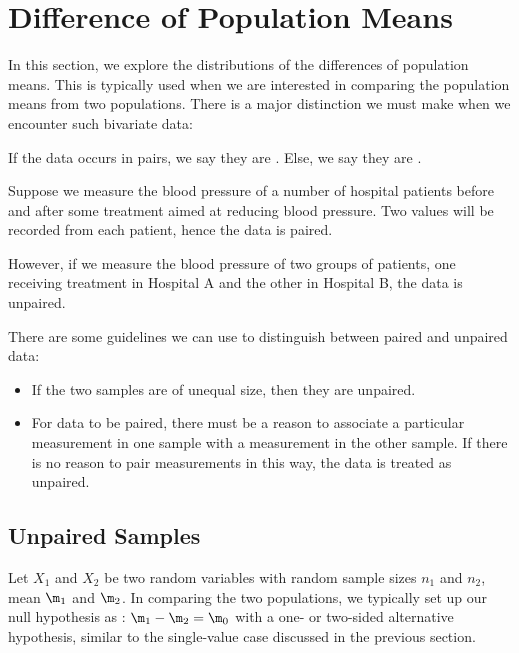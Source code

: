 \section{Difference of Population Means}

In this section, we explore the distributions of the differences of population means. This is typically used when we are interested in comparing the population means from two populations. There is a major distinction we must make when we encounter such bivariate data:

\begin{definition}
    If the data occurs in pairs, we say they are . Else, we say they are .
\end{definition}

\begin{example}
    Suppose we measure the blood pressure of a number of hospital patients before and after some treatment aimed at reducing blood pressure. Two values will be recorded from each patient, hence the data is paired.

    However, if we measure the blood pressure of two groups of patients, one receiving treatment in Hospital A and the other in Hospital B, the data is unpaired.
\end{example}

There are some guidelines we can use to distinguish between paired and unpaired data:
\begin{itemize}
    \item If the two samples are of unequal size, then they are unpaired.
    \item For data to be paired, there must be a reason to associate a particular measurement in one sample with a measurement in the other sample. If there is no reason to pair measurements in this way, the data is treated as unpaired.
\end{itemize}

\subsection{Unpaired Samples}

Let $X_1$ and $X_2$ be two random variables with random sample sizes $n_1$ and $n_2$, mean $\m_1$ and $\m_2$. In comparing the two populations, we typically set up our null hypothesis as \nullhyp: $\m_1 - \m_2 = \m_0$ with a one- or two-sided alternative hypothesis, similar to the single-value case discussed in the previous section.

